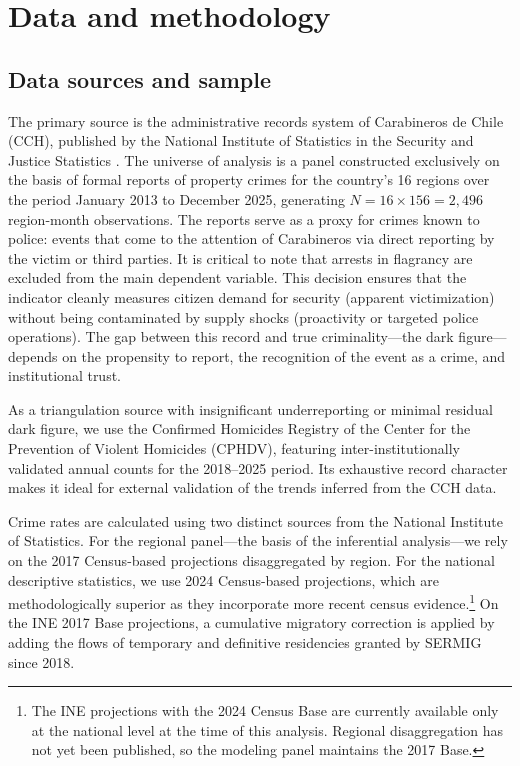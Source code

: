 \documentclass[pdflatex,sn-basic]{sn-jnl}
\begin{document}
\section{Data and methodology}
\label{sec:datos}

\subsection{Data sources and sample}

The primary source is the administrative records system of Carabineros de Chile
(CCH), published by the National Institute of Statistics in the Security and Justice
Statistics \citep{INE2026}. The universe of analysis is a panel constructed
exclusively on the basis of formal reports of property crimes
for the country's 16 regions over the period January 2013 to December 2025,
generating $N = 16 \times 156 = 2,496$ region-month observations. The reports serve
as a proxy for crimes known to police: events that come to the attention of
Carabineros via direct reporting by the victim or third parties. It is critical to
note that arrests in flagrancy are excluded from the main dependent variable. This
decision ensures that the indicator cleanly measures citizen demand for
security (apparent victimization) without being contaminated by supply shocks
(proactivity or targeted police operations). The gap between this
record and true criminality---the dark figure---depends on the propensity to report,
the recognition of the event as a crime, and institutional trust.

As a triangulation source with insignificant underreporting or minimal residual dark
figure, we use the Confirmed Homicides Registry of the Center for the Prevention of
Violent Homicides (CPHDV), featuring inter-institutionally validated annual counts for the
2018--2025 period. Its exhaustive record character makes it ideal for external
validation of the trends inferred from the CCH data.

Crime rates are calculated using two distinct sources from the National Institute of
Statistics. For the regional panel---the basis of the inferential analysis---we rely on
the 2017 Census-based projections disaggregated by region. For the national descriptive
statistics, we use 2024 Census-based projections,
which are methodologically superior as they incorporate more recent
census evidence.\footnote{The INE projections with the 2024 Census Base are currently
available only at the national level at the time of this analysis. Regional
disaggregation has not yet been published, so the modeling panel maintains the
2017 Base.} On the INE 2017 Base projections, a cumulative migratory correction is
applied by adding the flows of temporary and definitive residencies granted by
SERMIG since 2018.
\end{document}
